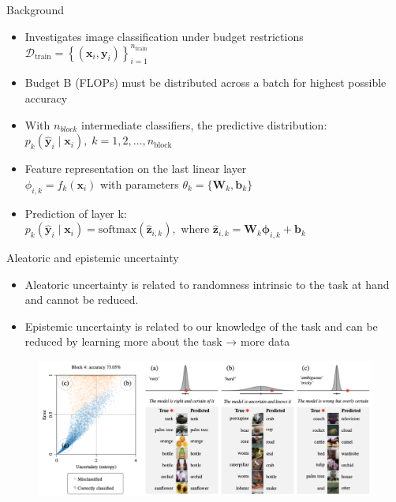 \documentclass[aspectratio=169,xcolor=dvipsnames]{beamer}
\begin{document}
\begin{frame}{Background}

    \begin{itemize}
        \item Investigates image classification under budget restrictions \\
              \(\mathcal{D}_{\text{train}} = \left\{ (\mathbf{x}_i, \mathbf{y}_i) \right\}_{i=1}^{n_{\text{train}}}\)
        \item Budget B (FLOPs) must be distributed across a batch for highest possible accuracy
        \item With $n_{block}$ intermediate classifiers, the predictive distribution: \\
              \( p_k(\hat{\mathbf{y}}_i \mid \mathbf{x}_i),\; k = 1, 2, \ldots, n_{\text{block}} \)
        \item Feature representation on the last linear layer \\
              \( \phi_{i,k} = f_k(\mathbf{x}_i) \) with parameters \( \theta_k = \{ \mathbf{W}_k, \mathbf{b}_k \} \)
        \item Prediction of layer k: \\
              \( p_k(\hat{\mathbf{y}}_i \mid \mathbf{x}_i) = \text{softmax}(\hat{\mathbf{z}}_{i,k}), \text{ where } \hat{\mathbf{z}}_{i,k} = \mathbf{W}_k \boldsymbol{\phi}_{i,k} + \mathbf{b}_k \)

    \end{itemize}

\end{frame}

\begin{frame}{Aleatoric and epistemic uncertainty}
    \begin{itemize}
        \item Aleatoric uncertainty is related to randomness intrinsic to the task at hand and cannot be reduced.
        \item Epistemic uncertainty is related to our knowledge of the task and can be reduced by learning more about the task → more data
    \end{itemize}
    \begin{figure}
        \centering
        \includegraphics[width=0.7\linewidth]{figs/Screenshot 2025-04-08 at 15.14.46.png}
        \label{fig:enter-label}
    \end{figure}
\end{frame}
\end{document}
